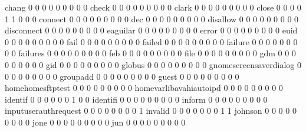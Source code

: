 \documentclass[compress,8pt]{beamer}
\begin{document}
\begin{frame}
\begin{Schunk}
  chang                                      0   0   0   0   0   0   0   0   0
  check                                      0   0   0   0   0   0   0   0   0
  clark                                      0   0   0   0   0   0   0   0   0
  close                                      0   0   0   0   1   1   0   0   0
  connect                                    0   0   0   0   0   0   0   0   0
  dec                                        0   0   0   0   0   0   0   0   0
  disallow                                   0   0   0   0   0   0   0   0   0
  disconnect                                 0   0   0   0   0   0   0   0   0
  eaguilar                                   0   0   0   0   0   0   0   0   0
  error                                      0   0   0   0   0   0   0   0   0
  euid                                       0   0   0   0   0   0   0   0   0
  fail                                       0   0   0   0   0   0   0   0   0
  failed                                     0   0   0   0   0   0   0   0   0
  failure                                    0   0   0   0   0   0   0   0   0
  failures                                   0   0   0   0   0   0   0   0   0
  feb                                        0   0   0   0   0   0   0   0   0
  file                                       0   0   0   0   0   0   0   0   0
  gdm                                        0   0   0   0   0   0   0   0   0
  gid                                        0   0   0   0   0   0   0   0   0
  globus                                     0   0   0   0   0   0   0   0   0
  gnomescreensaverdialog                     0   0   0   0   0   0   0   0   0
  groupadd                                   0   0   0   0   0   0   0   0   0
  guest                                      0   0   0   0   0   0   0   0   0
  homehomesftptest                           0   0   0   0   0   0   0   0   0
  homevarlibavahiautoipd                     0   0   0   0   0   0   0   0   0
  identif                                    0   0   0   0   0   0   1   0   0
  identifi                                   0   0   0   0   0   0   0   0   0
  inform                                     0   0   0   0   0   0   0   0   0
  inputuserauthrequest                       0   0   0   0   0   0   0   0   1
  invalid                                    0   0   0   0   0   0   0   1   1
  johnson                                    0   0   0   0   0   0   0   0   0
  jone                                       0   0   0   0   0   0   0   0   0
  jun                                        0   0   0   0   0   0   0   0   0

\end{Schunk}
\end{frame}
\end{document}
